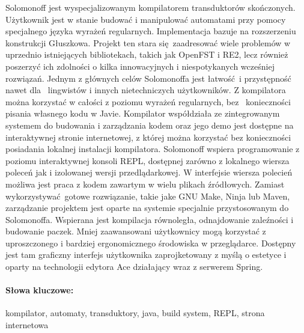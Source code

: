 \documentclass[oneside,english,logo]{amuthesis}
\author{Bohdan Bondar, Marcin Jałoński, Aleksander Mendoza-Drosik}
\date{Poznań, Luty 2021}
\begin{document}
	
	\maketitle
	\makestatement
	
	\begin{streszczenie}
		Solomonoff jest wyspecjalizowanym kompilatorem transduktorów skończonych. Użytkownik jest w stanie budować i manipulować automatami przy pomocy specjalnego języka wyrażeń regularnych. 
		Implementacja bazuje na rozszerzeniu konstrukcji Głuszkowa. Projekt ten 
		stara się zaadresować wiele problemów w~ uprzednio istniejących bibliotekach, takich jak OpenFST i RE2, lecz również poszerzyć ich 
		zdolności o kilka innowacyjnych i niespotykanych wcześniej rozwiązań. 
		Jednym z głównych celów Solomonoffa jest łatwość i przystępność
		nawet dla~ lingwistów i innych nietechniczych użytkowników. Z kompilatora można korzystać w całości z poziomu wyrażeń regularnych, bez~ konieczności pisania własnego kodu w Javie. Kompilator współdziała ze zintegrowanym systemem do budowania i zarządzania kodem oraz jego demo jest dostępne na interaktywnej stronie internetowej, z której można korzystać bez konieczności posiadania lokalnej instalacji kompilatora. Solomonoff wspiera programowanie z poziomu interaktywnej konsoli REPL, dostępnej zarówno z lokalnego wiersza poleceń jak i izolowanej wersji przedlądarkowej. W interfejsie wiersza polecień możliwa jest praca z kodem zawartym w wielu plikach źródłowych.  Zamiast wykorzystywać gotowe rozwiązanie, takie jake GNU Make, Ninja lub Maven, zarządzanie projektem jest oparte na systemie specjalnie przystosowanym do Solomonoffa. Wspierana jest kompilacja równoległa, odnajdowanie zaleźności i budowanie paczek.
		Mniej zaawansowani użytkownicy mogą korzystać z uproszczonego i bardziej ergonomicznego środowiska w przeglądarce. Dostępny jest tam graficzny interfejs użytkownika zaprojketowany z myślą o estetyce i oparty na technologii edytora Ace działający wraz z serwerem Spring.
		
		\paragraph{Słowa kluczowe:} kompilator, automaty, transduktory, java, build system, REPL, strona internetowa
	\end{streszczenie}
	
\end{document}
